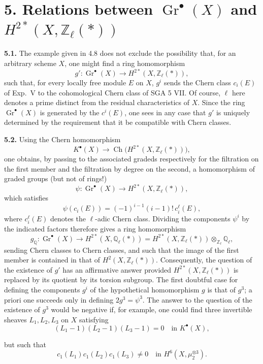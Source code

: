 \documentclass[11pt]{article}
\newcommand{\Q}{\mathbb Q}
\newcommand{\Zell}{\mathbb Z_{\ell}}
\newcommand{\Qell}{\mathbb Q_{\ell}}
\newcommand{\Ch}{\operatorname{Ch}}
\begin{document}
\section*{5. Relations between $\operatorname{Gr}^\bullet(X)$ and
$H^{2*}(X,\Zell(*))$}

\noindent\textbf{5.1.}
The example given in 4.8 does not exclude the possibility that, for an
arbitrary scheme $X$, one might find a ring homomorphism
\[
 g':\operatorname{Gr}^\bullet(X)
 \longrightarrow H^{2*}(X,\Zell(*)),
\]
such that, for every locally free module $E$ on $X$, $g^i$ sends the Chern
class $c_i(E)$ of Exp.~V to the cohomological Chern class of SGA 5 VII. Of
course, $\ell$ here denotes a prime distinct from the residual
characteristics of $X$. Since the ring $\operatorname{Gr}^\bullet(X)$ is
generated by the $c^i(E)$, one sees in any case that $g'$ is uniquely
determined by the requirement that it be compatible with Chern classes.

\noindent\textbf{5.2.}
Using the Chern homomorphism
\[
 K^\bullet(X)\longrightarrow
 \Ch\bigl(H^{2*}(X,\Zell(*))\bigr),
\]
one obtains, by passing to the associated gradeds respectively for the
filtration on the first member and the filtration by degree on the second,
a homomorphism of graded groups (but not of rings!)
\[
 \psi:\operatorname{Gr}^\bullet(X)
 \longrightarrow H^{2*}(X,\Zell(*)),
\]
which satisfies
\[
 \psi(c_i(E))=(-1)^{i-1}(i-1)!\,c_i^\ell(E),
\]
where $c_i^\ell(E)$ denotes the $\ell$-adic Chern class. Dividing the
components $\psi^i$ by the indicated factors therefore gives a ring
homomorphism
\[
 g_\Q:\operatorname{Gr}^\bullet(X)
 \longrightarrow H^{2*}(X,\Qell(*))
 =H^{2*}(X,\Zell(*))\otimes_{\Zell}\Qell,
\]
sending Chern classes to Chern classes, and such that the image of the first
member is contained in that of $H^2(X,\Zell(*))$. Consequently, the question
of the existence of $g'$ has an affirmative answer provided
$H^{2*}(X,\Zell(*))$ is replaced by its quotient by its torsion subgroup.
The first doubtful case for defining the components $g^i$ of the
hypothetical homomorphism $g$ is that of $g^3$; a priori one succeeds only
in defining $2g^3=\psi^3$. The answer to the question of the existence of
$g^3$ would be negative if, for example, one could find three invertible
sheaves $L_1,L_2,L_3$ on $X$ satisfying
\[
 (L_1-1)(L_2-1)(L_3-1)=0
 \quad\text{in }K^\bullet(X),
\]

but such that
\[
 c_1(L_1)c_1(L_2)c_1(L_3)\ne0
 \quad\text{in }H^6(X,\mu_2^{\otimes3}).
\]
\end{document}
